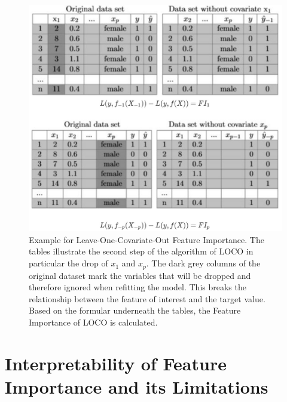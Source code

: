 \documentclass[]{krantz}
\begin{document}
\begin{figure}

{\centering \includegraphics[width=0.65\linewidth]{images/LOCO_All} 

}

\caption{Example for Leave-One-Covariate-Out Feature Importance. The tables illustrate the second step of the algorithm of LOCO in particular the drop of $x_{1}$ and $x_{p}$. The dark grey columns of the original dataset mark the variables that will be dropped and therefore ignored when refitting the model. This breaks the relationship between the feature of interest and the target value. Based on the formular underneath the tables, the Feature Importance of LOCO is calculated.}\label{fig:LOCO}
\end{figure}

\section{Interpretability of Feature Importance and its
Limitations}\label{interpretability-of-feature-importance-and-its-limitations}
\end{document}
